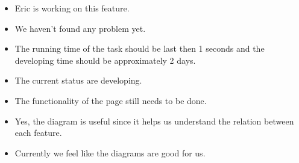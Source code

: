\documentclass[a4paper]{article}
\begin{document}
\begin{itemize}
	\item Eric is working on this feature. 
	\item We haven't found any problem yet.
    \item The running time of the task should be last then 1 seconds and the developing time should be approximately 2 days.
    \item The current status are developing.
  \item The functionality of the page still needs to be done.
  \item Yes, the diagram is useful since it helps us understand the relation between each feature.
  \item Currently we feel like the diagrams are good for us.
\end{itemize}
\end{document}

